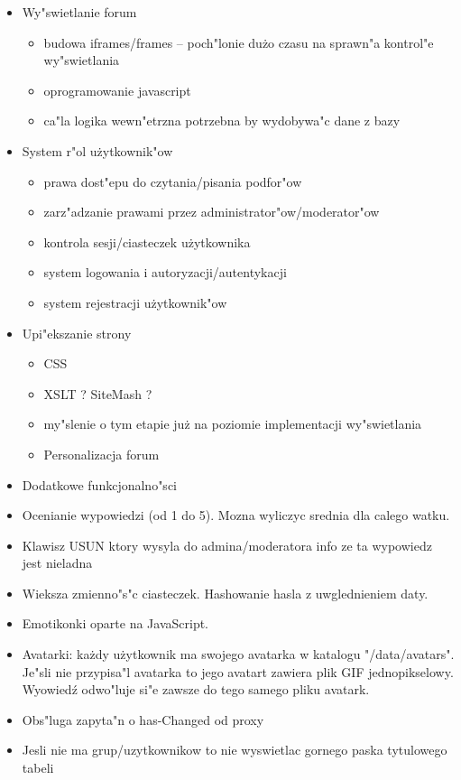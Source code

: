\documentclass[12pt,a4paper,twoside]{article}
\begin{document}
\begin{itemize}
\item		Wy"swietlanie forum
	\begin{itemize}
		\item budowa iframes/frames -- poch"lonie du\.zo czasu na sprawn"a kontrol"e wy"swietlania
		\item oprogramowanie javascript
		\item ca"la logika wewn"etrzna potrzebna by wydobywa"c dane z bazy
	\end{itemize}
\item 		System r"ol u\.zytkownik"ow
	\begin{itemize}
		\item prawa dost"epu do czytania/pisania podfor"ow
		\item zarz"adzanie prawami przez administrator"ow/moderator"ow
		\item kontrola sesji/ciasteczek u\.zytkownika
		\item system logowania i autoryzacji/autentykacji
		\item system rejestracji u\.zytkownik"ow
	\end{itemize}	
\item 		Upi"ekszanie strony
	\begin{itemize}
		\item CSS
		\item XSLT ? SiteMash ?
		\item my"slenie o tym etapie ju\.z na poziomie implementacji wy"swietlania
		\item Personalizacja forum
	\end{itemize}	
\item 		Dodatkowe funkcjonalno"sci
\end{itemize}		

\begin{itemize}
\item Ocenianie wypowiedzi (od 1 do 5). Mozna wyliczyc srednia dla calego watku.
\item Klawisz USUN ktory wysyla do admina/moderatora info ze ta wypowiedz jest nieladna
\item Wieksza zmienno"s"c ciasteczek. Hashowanie hasla z uwglednieniem daty.
\item Emotikonki oparte na JavaScript.
\item Avatarki: ka\.zdy u\.zytkownik ma swojego avatarka w katalogu "/data/avatars". Je"sli nie przypisa"l avatarka to jego avatart zawiera plik GIF jednopikselowy. Wyowied\'z odwo"luje si"e zawsze do tego samego pliku avatark.
\item Obs"luga zapyta"n o has-Changed od proxy
\item Jesli nie ma grup/uzytkownikow to nie wyswietlac gornego paska tytulowego tabeli

\end{itemize}
\end{document}
